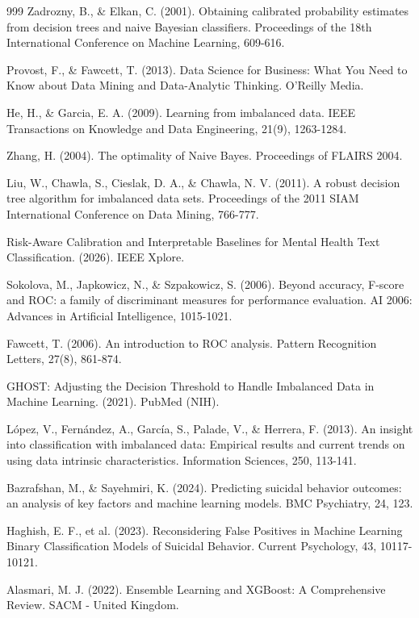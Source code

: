 \begin{thebibliography}{999}
 Zadrozny, B., \& Elkan, C. (2001). Obtaining calibrated probability estimates from decision trees and naive Bayesian classifiers. Proceedings of the 18th International Conference on Machine Learning, 609-616.

 Provost, F., \& Fawcett, T. (2013). Data Science for Business: What You Need to Know about Data Mining and Data-Analytic Thinking. O'Reilly Media.

 He, H., \& Garcia, E. A. (2009). Learning from imbalanced data. IEEE Transactions on Knowledge and Data Engineering, 21(9), 1263-1284.

 Zhang, H. (2004). The optimality of Naive Bayes. Proceedings of FLAIRS 2004.

 Liu, W., Chawla, S., Cieslak, D. A., \& Chawla, N. V. (2011). A robust decision tree algorithm for imbalanced data sets. Proceedings of the 2011 SIAM International Conference on Data Mining, 766-777.

 Risk-Aware Calibration and Interpretable Baselines for Mental Health Text Classification. (2026). IEEE Xplore.

 Sokolova, M., Japkowicz, N., \& Szpakowicz, S. (2006). Beyond accuracy, F-score and ROC: a family of discriminant measures for performance evaluation. AI 2006: Advances in Artificial Intelligence, 1015-1021.

 Fawcett, T. (2006). An introduction to ROC analysis. Pattern Recognition Letters, 27(8), 861-874.

 GHOST: Adjusting the Decision Threshold to Handle Imbalanced Data in Machine Learning. (2021). PubMed (NIH).

 López, V., Fernández, A., García, S., Palade, V., \& Herrera, F. (2013). An insight into classification with imbalanced data: Empirical results and current trends on using data intrinsic characteristics. Information Sciences, 250, 113-141.

 Bazrafshan, M., \& Sayehmiri, K. (2024). Predicting suicidal behavior outcomes: an analysis of key factors and machine learning models. BMC Psychiatry, 24, 123.

 Haghish, E. F., et al. (2023). Reconsidering False Positives in Machine Learning Binary Classification Models of Suicidal Behavior. Current Psychology, 43, 10117-10121.

 Alasmari, M. J. (2022). Ensemble Learning and XGBoost: A Comprehensive Review. SACM - United Kingdom.


\end{thebibliography}
